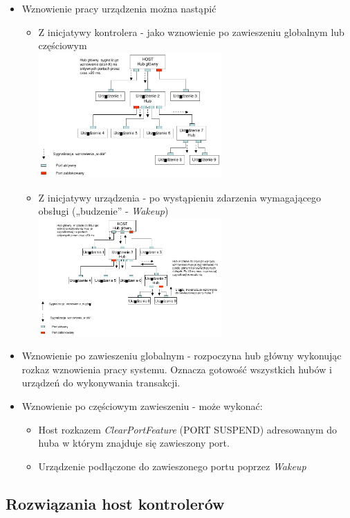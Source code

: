 \begin{itemize}
\begin{itemize}
			\item Wznowienie pracy urządzenia można nastąpić
			\begin{itemize}
				\item Z inicjatywy kontrolera - jako wznowienie po zawieszeniu globalnym lub częściowym\\
				\includegraphics[width=7cm]{./wyklady/USB_43_1.pdf}
				\item Z inicjatywy urządzenia - po wystąpieniu zdarzenia wymagającego obsługi („budzenie” - \emph{Wakeup})\\
				\includegraphics[width=7cm]{./wyklady/USB_44_1.pdf}
			\end{itemize}
			\item Wznowienie po zawieszeniu globalnym - rozpoczyna hub główny wykonując rozkaz wznowienia pracy systemu. Oznacza gotowość wszystkich hubów i urządzeń do wykonywania transakcji.
			\item Wznowienie po częściowym zawieszeniu - może wykonać:
			\begin{itemize}
				\item Host rozkazem \emph{ClearPortFeature} (PORT SUSPEND) adresowanym do huba w którym znajduje się zawieszony port.
				\item Urządzenie podłączone do zawieszonego portu poprzez \emph{Wakeup}
			\end{itemize}
		\end{itemize}
	\end{itemize}
	
\subsection{Rozwiązania host kontrolerów}
